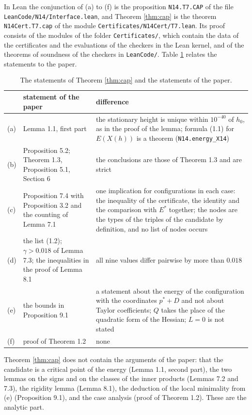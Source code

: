 \documentclass[reqno,a4paper,11pt]{amsart}
\newcommand{\lean}[1]{\texttt{#1}}
\newcommand{\file}[1]{\nolinkurl{#1}}
\begin{document}
In Lean the conjunction of (a) to (f) is the proposition \lean{N14.T7.CAP} of the file \file{LeanCode/N14/Interface.lean}, and Theorem \ref{thm:cap} is the theorem \lean{N14Cert.T7.cap} of the module \file{Certificates/N14Cert/T7.lean}. Its proof consists of the modules of the folder \file{Certificates/}, which contain the data of the certificates and the evaluations of the checkers in the Lean kernel, and of the theorems of soundness of the checkers in \file{LeanCode/}. Table \ref{tab:paper} relates the statements to the paper.

\begin{table}[ht]
\centering
\small
\begin{tabular}{@{}lp{}p{}@{}}
\toprule
 & statement of the paper & difference \\
\midrule
(a) & Lemma 1.1, first part & the stationary height is unique within $10^{-40}$ of $h_0$, as in the proof of the lemma; formula (1.1) for $E(X(h))$ is a theorem (\lean{N14.energy\_X14}) \\
(b) & Proposition 5.2; Theorem 1.3, Proposition 5.1, Section 6 & the conclusions are those of Theorem 1.3 and are strict \\
(c) & Proposition 7.4 with Proposition 3.2 and the counting of Lemma 7.1 & one implication for configurations in each case: the inequality of the certificate, the identity and the comparison with $E^*$ together; the nodes are the types of the triples of the candidate by definition, and no list of nodes occurs \\
(d) & the list (1.2); $\gamma > 0.018$ of Lemma 7.3; the inequalities in the proof of Lemma 8.1 & all nine values differ pairwise by more than $0.018$ \\
(e) & the bounds in Proposition 9.1 & a statement about the energy of the configuration with the coordinates $p^* + D$ and not about Taylor coefficients; $Q$ takes the place of the quadratic form of the Hessian; $L = 0$ is not stated \\
(f) & proof of Theorem 1.2 & none \\
\bottomrule
\end{tabular}
\medskip
\caption{The statements of Theorem \ref{thm:cap} and the statements of the paper.}\label{tab:paper}
\end{table}

Theorem \ref{thm:cap} does not contain the arguments of the paper: that the candidate is a critical point of the energy (Lemma 1.1, second part), the two lemmas on the signs and on the classes of the inner products (Lemmas 7.2 and 7.3), the rigidity lemma (Lemma 8.1), the deduction of the local minimality from (e) (Proposition 9.1), and the case analysis (proof of Theorem 1.2). These are the analytic part.
\end{document}
